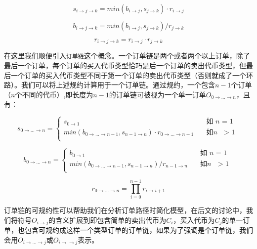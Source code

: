 \documentclass[UTF8,nofonts]{ctexart}
\begin{document}
\begin{equation}
s_{i\rightarrow j\rightarrow k}=min(b_{i\rightarrow j},s_{j\rightarrow k}) \cdot r_{i\rightarrow j}
\end{equation}

\begin{equation}
b_{i\rightarrow j\rightarrow k}=min(b_{i\rightarrow j},s_{j\rightarrow k}) / r_{j\rightarrow k}
\end{equation}

\begin{equation}
r_{i\rightarrow j\rightarrow k}= r_{i\rightarrow j}\cdot r_{j\rightarrow k}
\end{equation}


在这里我们顺便引入\texttt{订单链}这个概念。一个订单链是两个或者两个以上订单，除了最后一个订单，每个订单的买入代币类型恰巧是后一个订单的卖出代币类型，但最后一个订单的买入代币类型不同于第一个订单的卖出代币类型（否则就成了一个环路）。我们可以将上述规约计算用于一个订单链。通过规约，一个包含$n-1$个订单（$n$个不同的代币）,即长度为$n-1$的订单链可被视为一个单一订单$O_{0\rightarrow ...\rightarrow n}$，且有：

\[ s_{0\rightarrow ...\rightarrow n} =
  \begin{cases}
    s_{0\rightarrow 1}      & \quad \text{如 } n \text{ = 1}\\
    min(b_{0\rightarrow ...\rightarrow n-1},s_{n-1\rightarrow n}) \cdot r_{0\rightarrow ...\rightarrow n-1}  & \quad \text{如} n \text{ $>$ 1}\\
  \end{cases}
\]

\[ b_{0\rightarrow ...\rightarrow n} =
  \begin{cases}
    b_{0\rightarrow 1}      & \quad \text{如 } n \text{ = 1}\\
    min(b_{0\rightarrow ...\rightarrow n-1},s_{n-1\rightarrow n}) / r_{n-1\rightarrow n}  & \quad \text{如} n \text{ $>$ 1}\\
  \end{cases}
\]


\[ r_{0\rightarrow ...\rightarrow n} = \prod_{i=0}^{n-1}{r_{i\rightarrow i+1}}
\]


订单链的可规约性可以帮助我们在分析订单路径时简化模型，在后文的讨论中，我们将符号$O_{i \rightarrow j}$的含义扩展到即包含简单的卖出代币为$C_i$，买入代币为$C_j$的单一订单，也包含可规约成这样一个类型订单的订单链，如果为了强调是个订单链，我们会用$O_{i \rightarrow ...\rightarrow j}$或$O_{i \rightarrow \rightarrow j}$表示。
\end{document}
